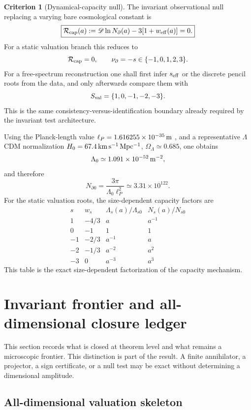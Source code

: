 \documentclass[aps,prd,reprint,nofootinbib,superscriptaddress]{revtex4-2}
\numberwithin{equation}{section}
\theoremstyle{definition}
\newtheorem{criterion}{Criterion}[section]
\theoremstyle{plain}
\newcommand{\Dil}{\mathscr D}
\begin{document}
\begin{criterion}[Dynamical-capacity null]
The invariant observational null replacing a varying bare cosmological constant is
\[
\boxed{
\mathcal R_{\rm cap}(a):=
\Dil\ln N_\partial(a)-3[1+w_{\rm eff}(a)]=0.
}
\]
For a static valuation branch this reduces to
\[
\mathcal R_{\rm cap}=0,\qquad
\nu_\partial=-s\in\{-1,0,1,2,3\}.
\]
For a free-spectrum reconstruction one shall first infer \(s_{\rm eff}\) or the discrete pencil roots from the data, and only afterwards compare them with
\[
S_{\rm val}=\{1,0,-1,-2,-3\}.
\]
This is the same consistency-versus-identification boundary already required by the invariant test architecture.
\end{criterion}

Using the Planck-length value \( \ell_P=1.616255\times10^{-35}\,{\rm m}\) \cite{NISTPlanckLength2022}, and a representative \(\Lambda\)CDM normalization \(H_0=67.4\,{\rm km\,s^{-1}\,Mpc^{-1}}\), \(\Omega_\Lambda\simeq0.685\), one obtains
\[
\Lambda_0\simeq1.091\times10^{-52}\,{\rm m}^{-2},
\]
and therefore
\[
\boxed{
N_{\partial0}
=
\frac{3\pi}{\Lambda_0\ell_P^2}
\simeq3.31\times10^{122}.
}
\]
For the static valuation roots, the size-dependent capacity factors are
\[
\begin{array}{c|c|c|c}
s & w_s & \Lambda_s(a)/\Lambda_{s0} & N_s(a)/N_{s0}\\
\hline
1 & -4/3 & a & a^{-1}\\
0 & -1 & 1 & 1\\
-1 & -2/3 & a^{-1} & a\\
-2 & -1/3 & a^{-2} & a^2\\
-3 & 0 & a^{-3} & a^3
\end{array}
\]
This table is the exact size-dependent factorization of the capacity mechanism.




\section{Invariant frontier and all-dimensional closure ledger}
\label{sec:frontier}

This section records what is closed at theorem level and what remains a
microscopic frontier.  This distinction is part of the result.  A finite
annihilator, a projector, a sign certificate, or a null test may be exact
without determining a dimensional amplitude.

\subsection{All-dimensional valuation skeleton}
\end{document}
